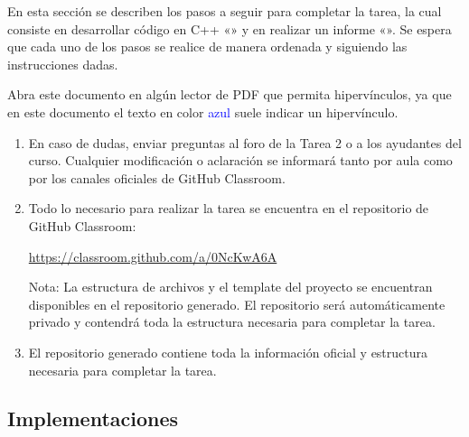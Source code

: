 En esta sección se describen los pasos a seguir para completar la tarea, la cual consiste en desarrollar código
en C++ «» y en realizar un informe «». Se espera que cada
uno de los pasos se realice de manera ordenada y siguiendo las instrucciones dadas.

\begin{mdframed}
    Abra este documento en algún lector de PDF que permita hipervínculos, ya que en este documento el texto en
    color \textcolor{blue}{azul} suele indicar un hipervínculo.
\end{mdframed}

\begin{enumerate}[(1)]
    \item En caso de dudas, enviar preguntas al foro de la Tarea 2 o a los ayudantes del curso. 
    Cualquier modificación o aclaración se informará tanto por aula como por los canales oficiales de GitHub Classroom.

    \item Todo lo necesario para realizar la tarea se encuentra en el repositorio de GitHub Classroom: 
    \begin{center}
        \url{https://classroom.github.com/a/0NcKwA6A}
    \end{center}
    Nota: La estructura de archivos y el template del proyecto se encuentran disponibles en el repositorio generado. 
    El repositorio será automáticamente privado y contendrá toda la estructura necesaria para completar la tarea.

    \item El repositorio generado contiene toda la información oficial y estructura necesaria para completar la tarea.

\end{enumerate}

\subsection{Implementaciones} \label{subsec:implementations}

